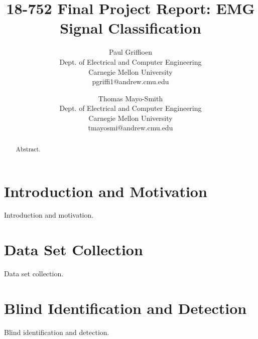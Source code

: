 \documentclass[times, 10pt,twocolumn]{article}
\begin{document}
\title{18-752 Final Project Report: EMG Signal Classification}

\author{Paul Griffioen\\Dept. of Electrical and Computer Engineering\\Carnegie Mellon University\\ pgriffi1@andrew.cmu.edu\\
\and
Thomas Mayo-Smith\\Dept. of Electrical and Computer Engineering\\Carnegie Mellon University\\tmayosmi@andrew.cmu.edu\\
}

\maketitle
\thispagestyle{empty}

\begin{abstract}
Abstract.
\end{abstract}

\section{Introduction and Motivation}

Introduction and motivation.

\section{Data Set Collection}

Data set collection.

\section{Blind Identification and Detection}

Blind identification and detection.
\end{document}
